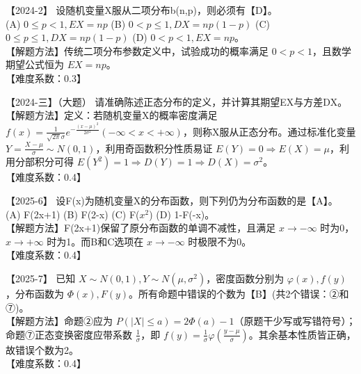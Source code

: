 \documentclass[zihao=4, a4paper, fontset=mac]{ctexart}
\begin{document}
\par\vspace{\baselineskip}

【2024-2】 设随机变量X服从二项分布b(n,p)，则必须有【D】。\\
(A) $0\le p<1, EX=np$ \quad (B) $0<p\le1, DX=np(1-p)$ \quad (C) $0\le p\le1, DX=np(1-p)$ \quad (D) $0<p<1, EX=np$。\\
【解题方法】传统二项分布参数定义中，试验成功的概率满足 $0<p<1$，且数学期望公式恒为 $EX=np$。\\
【难度系数：0.3】

\par\vspace{\baselineskip}

【2024-三】（大题） 请准确陈述正态分布的定义，并计算其期望EX与方差DX。\\
【解题方法】定义：若随机变量X的概率密度满足 $f(x)=\frac{1}{\sqrt{2\pi}\sigma}e^{-\frac{(x-\mu)^2}{2\sigma^2}} (-\infty<x<+\infty)$，则称X服从正态分布。通过标准化变量 $Y=\frac{X-\mu}{\sigma}\sim N(0,1)$，利用奇函数积分性质易证 $E(Y)=0 \Rightarrow E(X)=\mu$，利用分部积分可得 $E(Y^2)=1 \Rightarrow D(Y)=1 \Rightarrow D(X)=\sigma^2$。\\
【难度系数：0.4】

\par\vspace{\baselineskip}

【2025-6】 设F(x)为随机变量X的分布函数，则下列仍为分布函数的是【A】。\\
(A) F(2x+1) \quad (B) F(2-x) \quad (C) F($x^2$) \quad (D) 1-F(-x)。\\
【解题方法】F(2x+1)保留了原分布函数的单调不减性，且满足 $x\rightarrow-\infty$ 时为0，$x\rightarrow+\infty$ 时为1。而B和C选项在 $x\rightarrow-\infty$ 时极限不为0。\\
【难度系数：0.4】

\par\vspace{\baselineskip}

【2025-7】 已知 $X\sim N(0,1), Y\sim N(\mu,\sigma^2)$，密度函数分别为 $\varphi(x), f(y)$，分布函数为 $\Phi(x), F(y)$。所有命题中错误的个数为【B】(共2个错误：②和⑦)。\\
【解题方法】命题②应为 $P(|X|\le a)=2\Phi(a)-1$（原题干少写或写错符号）；命题⑦正态变换密度应带系数 $\frac{1}{\sigma}$，即 $f(y)=\frac{1}{\sigma}\varphi(\frac{y-\mu}{\sigma})$。其余基本性质皆正确，故错误个数为2。\\
【难度系数：0.4】

\par\vspace{\baselineskip}
\end{document}
